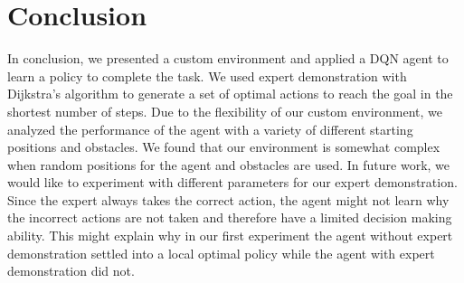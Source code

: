 \documentclass[conference]{IEEEtran}
\begin{document}
\FloatBarrier
\section{Conclusion}
In conclusion, we presented a custom environment and applied a DQN agent to
learn a policy to complete the task. We used expert demonstration with
Dijkstra's algorithm to generate a set of optimal actions to reach the goal in
the shortest number of steps. Due to the flexibility of our custom environment,
we analyzed the performance of the agent with a variety of different starting
positions and obstacles. We found that our environment is somewhat complex when
random positions for the agent and obstacles are used. In future work, we would
like to experiment with different parameters for our expert demonstration. Since
the expert always takes the correct action, the agent might not learn why the
incorrect actions are not taken and therefore have a limited decision making
ability. This might explain why in our first experiment the agent without expert
demonstration settled into a local optimal policy while the agent with expert
demonstration did not.



\end{document}
